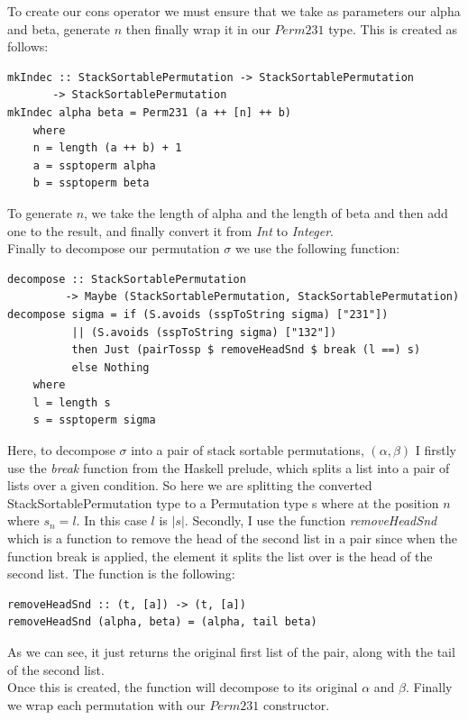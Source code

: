 \documentclass[12pt]{article}
\begin{document}
To create our cons operator we must ensure that we take as parameters our alpha and beta, generate $n$ then finally wrap it in our $Perm231$ type. This is created as follows:
\begin{lstlisting}
mkIndec :: StackSortablePermutation -> StackSortablePermutation 
	   -> StackSortablePermutation
mkIndec alpha beta = Perm231 (a ++ [n] ++ b)
	where
	n = length (a ++ b) + 1
	a = ssptoperm alpha
	b = ssptoperm beta
\end{lstlisting}
To generate $n$, we take the length of alpha and the length of beta and then add one to the result, and finally convert it from {\it Int} to {\it Integer}.\\
Finally to decompose our permutation $\sigma$ we use the following function:
\begin{lstlisting}
decompose :: StackSortablePermutation 
	     -> Maybe (StackSortablePermutation, StackSortablePermutation)
decompose sigma = if (S.avoids (sspToString sigma) ["231"]) 
		  || (S.avoids (sspToString sigma) ["132"])
		  then Just (pairTossp $ removeHeadSnd $ break (l ==) s)
		  else Nothing
	where
	l = length s
	s = ssptoperm sigma
\end{lstlisting}
Here, to decompose $\sigma$ into a pair of stack sortable permutations, $(\alpha, \beta)$ I firstly use the {\it break} function from the Haskell prelude, which splits a list into a pair of lists over a given condition. So here we are splitting the converted StackSortablePermutation type to a Permutation type s where at the position $n$ where $s_n = l$. In this case $l$ is $|s|$. Secondly, I use the function {\it removeHeadSnd} which is a function to remove the head of the second list in a pair since when the function break is applied, the element it splits the list over is the head of the second list. The function is the following:\\
\begin{lstlisting}
removeHeadSnd :: (t, [a]) -> (t, [a])
removeHeadSnd (alpha, beta) = (alpha, tail beta)
\end{lstlisting} 
As we can see, it just returns the original first list of the pair, along with the tail of the second list.\\
Once this is created, the function will decompose to its original $\alpha$ and $\beta$. Finally we wrap each permutation with our $Perm231$ constructor.
\end{document}
